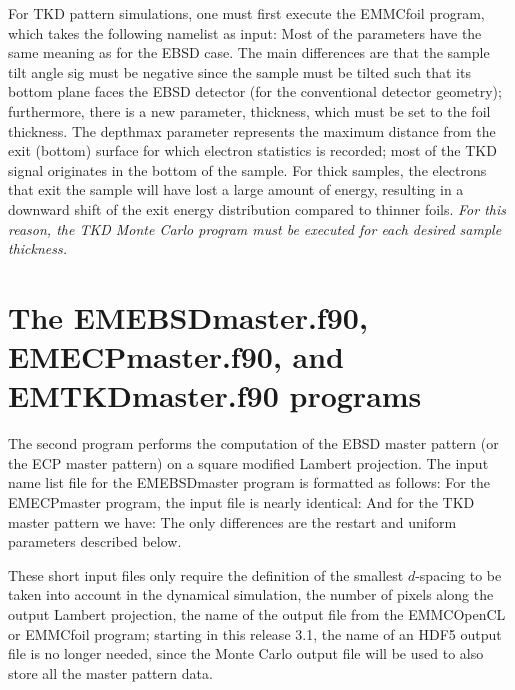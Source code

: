 \documentclass[DIV=calc, paper=letter, fontsize=11pt]{scrartcl}	 %
\begin{document}
For TKD pattern simulations, one must first execute the \textsf{EMMCfoil} program, which takes the following namelist as input:
Most of the parameters have the same meaning as for the EBSD case.  The main differences are that the sample tilt angle \textsf{sig} must
be negative since the sample must be tilted such that its bottom plane faces the EBSD detector (for the conventional detector geometry);
furthermore, there is a new parameter, \textsf{thickness}, which must be set to the foil thickness.  The depthmax parameter represents the 
maximum distance from the exit (bottom) surface for which electron statistics is recorded; most of the TKD signal originates in the bottom
of the sample.  For thick samples, the electrons that exit the sample will have lost a large amount of energy, resulting in a downward shift
of the exit energy distribution compared to thinner foils.  \textit{For this reason, the TKD Monte Carlo program must be executed for each desired sample 
thickness.}

\section{The \protect\textsf{EMEBSDmaster.f90}, \protect\textsf{EMECPmaster.f90}, and \protect\textsf{EMTKDmaster.f90} programs\label{sec:f90EBSDmaster}}
The second program performs the computation of the EBSD master pattern (or the ECP master pattern) on a
square modified Lambert projection. The input name list file for the \textsf{EMEBSDmaster} program is formatted as follows:
For the \textsf{EMECPmaster} program, the input file is nearly identical:
And for the TKD master pattern we have:
The only differences are the \textsf{restart} and \textsf{uniform} parameters described below.

These short input files only require the definition of the smallest $d$-spacing to be taken into account 
in the dynamical simulation, the number of pixels along the output Lambert projection, the name of the 
output file from the \textsf{EMMCOpenCL} or \textsf{EMMCfoil} program; starting in this release 3.1, the name of an HDF5 output file is no longer needed, 
since the Monte Carlo output file will be used to also store all the master pattern data. 
\end{document}

